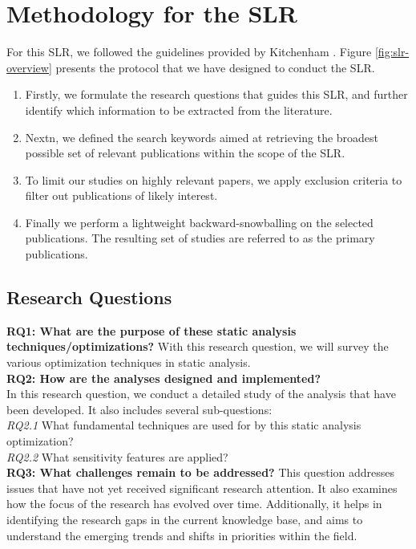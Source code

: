 \section{Methodology for the SLR}
For this SLR, we followed the guidelines provided by Kitchenham \cite{kitchenham2004procedures}. Figure \ref{fig:slr-overview} presents the protocol that we have designed to conduct the SLR.
\begin{enumerate}
    \item Firstly, we formulate the research questions that guides this SLR, and further identify which information to be extracted from the literature.
    \item Nextn, we defined the search keywords aimed at retrieving the broadest possible set of relevant publications within the scope of the SLR.
    \item To limit our studies on highly relevant papers, we apply exclusion criteria to filter out publications of likely interest.
    \item Finally we perform a lightweight backward-snowballing on the selected publications. The resulting set of studies are referred to as the primary publications.
\end{enumerate}


\subsection{Research Questions}

\textbf{RQ1: What are the purpose of these static analysis techniques/optimizations?}
With this research question, we will survey the various optimization techniques in static analysis. \\
\textbf{RQ2: How are the analyses designed and implemented?} \\
In this research question, we conduct a detailed study of the analysis that have been developed. It also includes several sub-questions:\\
\textit{RQ2.1} What fundamental techniques are used for by this static analysis optimization?\\
\textit{RQ2.2} What sensitivity features are applied?\\
\textbf{RQ3: What challenges remain to be addressed?}
This question addresses issues that have not yet received significant research attention. It also examines how the focus of the research has evolved over time. 
Additionally, it helps in identifying the research gaps in the current knowledge base, and aims to understand the emerging trends and shifts in priorities within the field.

